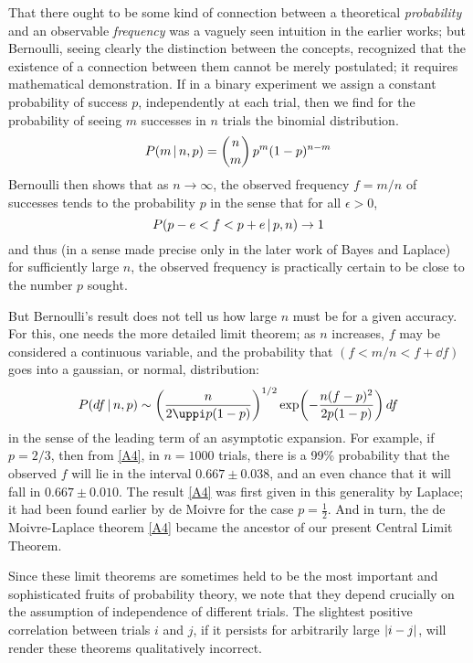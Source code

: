 That there ought to be some kind of connection between a theoretical \emph{probability} and an observable \emph{frequency} was a vaguely seen intuition in the earlier works; but Bernoulli, seeing clearly the distinction between the concepts, recognized that the existence of a connection between them cannot be merely postulated; it requires mathematical demonstration.
If in a binary experiment we assign a constant probability of success $p$, independently at each trial, then we find for the probability of seeing $m$ successes in $n$ trials the binomial distribution.
\begin{equation}
	\label{A2}
	P(m\,\vert\, n, p) = \binom{n}{m} \, p^m (1-p)^{n-m}
\end{equation}
Bernoulli then shows that as $n\to\infty$, the observed frequency $f=m/n$ of successes tends to the probability $p$ in the sense that for all $\epsilon > 0$,
\begin{equation}
	\label{A3}
	P(p-e<f<p+e \,\vert\, p,n) \to 1
\end{equation}
and thus (in a sense made precise only in the later work of Bayes and Laplace) for sufficiently large $n$, the observed frequency is practically certain to be close to the number $p$ sought.

But Bernoulli's result does not tell us how large $n$ must be for a given accuracy.
For this, one needs the more detailed limit theorem; as $n$ increases, $f$ may be considered a continuous variable, and the probability that $(f<m/n<f+\dd f)$ goes into a gaussian, or normal, distribution:
\begin{equation}
	\label{A4}
	P(\dd f\given n, p) \sim \left(\frac{n}{2\uppi p(1-p)}\right)^{1/2} \exp\left(-\frac{n(f-p)^2}{2p(1-p)}\right)\dd f
\end{equation}
in the sense of the leading term of an asymptotic expansion.
For example, if $p=2/3$, then from \eqref{A4}, in $n=1000$ trials, there is a 99\% probability that the observed $f$ will lie in the interval $0.667 \pm 0.038$, and an even chance that it will fall in $0.667\pm0.010$.
The result \eqref{A4} was first given in this generality by Laplace; it had been found earlier by de Moivre for the case $p=\frac{1}{2}$.
And in turn, the de Moivre-Laplace theorem \eqref{A4} became the ancestor of our present Central Limit Theorem.

Since these limit theorems are sometimes held to be the most important and sophisticated fruits of probability theory, we note that they depend crucially on the assumption of independence of different trials.
The slightest positive correlation between trials $i$ and $j$, if it persists for arbitrarily large $\lvert i-j\rvert$, will render these theorems qualitatively incorrect.

